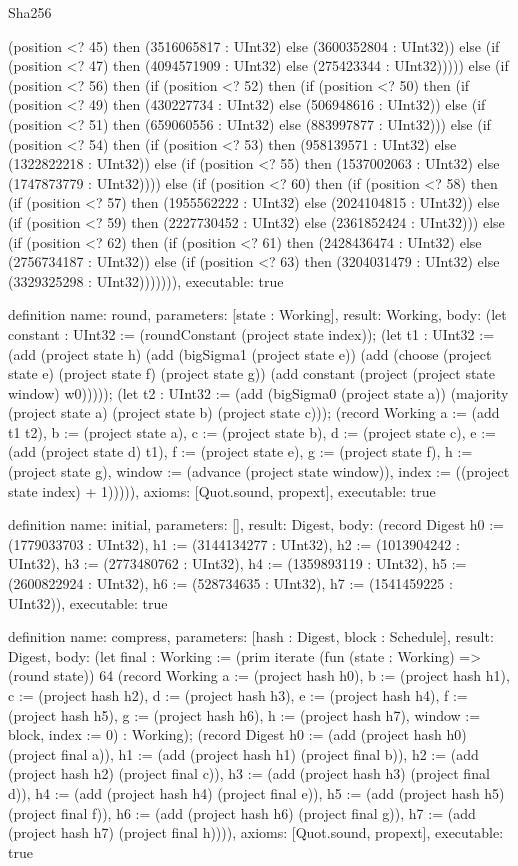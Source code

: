 \begin{lexlean}{Sha256}
\begin{semanticmodule}
{(position <? 45) then (3516065817 : UInt32) else (3600352804 : UInt32)) else (if (position <? 47) then (4094571909 : UInt32) else (275423344 : UInt32))))) else (if (position <? 56) then (if (position <? 52) then (if (position <? 50) then (if (position <? 49) then (430227734 : UInt32) else (506948616 : UInt32)) else (if (position <? 51) then (659060556 : UInt32) else (883997877 : UInt32))) else (if (position <? 54) then (if (position <? 53) then (958139571 : UInt32) else (1322822218 : UInt32)) else (if (position <? 55) then (1537002063 : UInt32) else (1747873779 : UInt32)))) else (if (position <? 60) then (if (position <? 58) then (if (position <? 57) then (1955562222 : UInt32) else (2024104815 : UInt32)) else (if (position <? 59) then (2227730452 : UInt32) else (2361852424 : UInt32))) else (if (position <? 62) then (if (position <? 61) then (2428436474 : UInt32) else (2756734187 : UInt32)) else (if (position <? 63) then (3204031479 : UInt32) else (3329325298 : UInt32))))))),
  executable: true
}

definition{
  name: round,
  parameters: [state : Working],
  result: Working,
  body: (let constant : UInt32 := (roundConstant (project state index)); (let t1 : UInt32 := (add (project state h) (add (bigSigma1 (project state e)) (add (choose (project state e) (project state f) (project state g)) (add constant (project (project state window) w0))))); (let t2 : UInt32 := (add (bigSigma0 (project state a)) (majority (project state a) (project state b) (project state c))); (record Working {a := (add t1 t2), b := (project state a), c := (project state b), d := (project state c), e := (add (project state d) t1), f := (project state e), g := (project state f), h := (project state g), window := (advance (project state window)), index := ((project state index) + 1)})))),
  axioms: [Quot.sound, propext],
  executable: true
}

definition{
  name: initial,
  parameters: [],
  result: Digest,
  body: (record Digest {h0 := (1779033703 : UInt32), h1 := (3144134277 : UInt32), h2 := (1013904242 : UInt32), h3 := (2773480762 : UInt32), h4 := (1359893119 : UInt32), h5 := (2600822924 : UInt32), h6 := (528734635 : UInt32), h7 := (1541459225 : UInt32)}),
  executable: true
}

definition{
  name: compress,
  parameters: [hash : Digest, block : Schedule],
  result: Digest,
  body: (let final : Working := (prim iterate (fun (state : Working) => (round state)) 64 (record Working {a := (project hash h0), b := (project hash h1), c := (project hash h2), d := (project hash h3), e := (project hash h4), f := (project hash h5), g := (project hash h6), h := (project hash h7), window := block, index := 0}) : Working); (record Digest {h0 := (add (project hash h0) (project final a)), h1 := (add (project hash h1) (project final b)), h2 := (add (project hash h2) (project final c)), h3 := (add (project hash h3) (project final d)), h4 := (add (project hash h4) (project final e)), h5 := (add (project hash h5) (project final f)), h6 := (add (project hash h6) (project final g)), h7 := (add (project hash h7) (project final h))})),
  axioms: [Quot.sound, propext],
  executable: true
}


\end{semanticmodule}
\end{lexlean}
